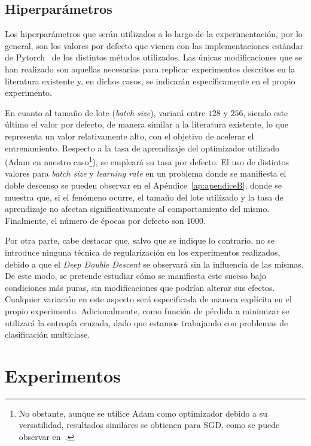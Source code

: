 \subsection{Hiperparámetros}\label{subsec:hiperparametros}

Los hiperparámetros que serán utilizados a lo largo de la experimentación, por lo general, son los valores por defecto que vienen con las implementaciones estándar de Pytorch~\cite{NEURIPS2019_9015} de los distintos métodos utilizados. Las únicas modificaciones que se han realizado son aquellas necesarias para replicar experimentos descritos en la literatura existente y, en dichos casos, se indicarán específicamente en el propio experimento.

En cuanto al tamaño de lote (\textit{batch size}), variará entre $128$ y $256$, siendo este último el valor por defecto, de manera similar a la literatura existente, lo que representa un valor relativamente alto, con el objetivo de acelerar el entrenamiento. Respecto a la tasa de aprendizaje del optimizador utilizado (Adam en nuestro caso\footnote{No obstante, aunque se utilice Adam como optimizador debido a su versatilidad, resultados similares se obtienen para SGD, como se puede observar en~\cite{Nakkiran2019}.}), se empleará su tasa por defecto. El uso de distintos valores para \textit{batch size} y \textit{learning rate} en un problema donde se manifiesta el doble descenso se pueden observar en el Apéndice~\ref{ap:apendiceB}, donde se muestra que, si el fenómeno ocurre, el tamaño del lote utilizado y la tasa de aprendizaje no afectan significativamente al comportamiento del mismo. Finalmente, el número de épocas por defecto son $1000$.

Por otra parte, cabe destacar que, salvo que se indique lo contrario, no se introduce ninguna técnica de regularización en los experimentos realizados, debido a que el \textit{Deep Double Descent} se observará sin la influencia de las mismas. De este modo, se pretende estudiar cómo se manifiesta este suceso bajo condiciones más puras, sin modificaciones que podrían alterar sus efectos. Cualquier variación en este aspecto será especificada de manera explícita en el propio experimento. Adicionalmente, como función de pérdida a minimizar se utilizará la entropía cruzada, dado que estamos trabajando con problemas de clasificación multiclase.

\section{Experimentos}\label{sec:experimentos}

